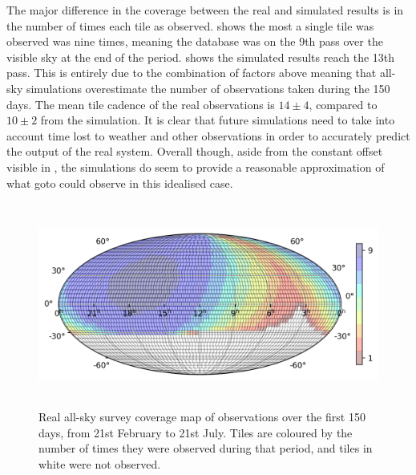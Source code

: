 \begin{colsection}
\begin{colsection}
The major difference in the coverage between the real and simulated results is in the number of times each tile as observed.  shows the most a single tile was observed was nine times, meaning the database was on the 9th pass over the visible sky at the end of the period.  shows the simulated results reach the 13th pass. This is entirely due to the combination of factors above meaning that all-sky simulations overestimate the number of observations taken during the 150 days. The mean tile cadence of the real observations is $14\pm4$, compared to $10\pm2$ from the simulation. It is clear that future simulations need to take into account time lost to weather and other observations in order to accurately predict the output of the real system. Overall though, aside from the constant offset visible in , the simulations do seem to provide a reasonable approximation of what \gls{goto} could observe in this idealised case.

\begin{figure}[p]
    \begin{center}
        \includegraphics[height=190pt]{images/survey_sims/150_1N4_real.png}
    \end{center}

    \caption[Real survey observations over 150 days]{
        Real all-sky survey coverage map of observations over the first 150 days, from 21st February to 21st July. Tiles are coloured by the number of times they were observed during that period, and tiles in white were not observed.
    }\label{fig:survey_real_150}
\end{figure}


\end{colsection}
\end{colsection}
